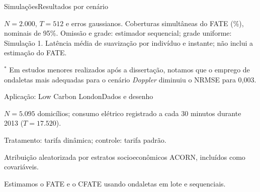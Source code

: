 \documentclass[aspectratio=169,t]{beamer}
\begin{document}
\begin{frame}{Simulações}{Resultados por cenário}
{\tamLegenda\renewcommand{}\setlength{\tabcolsep}{4bp}
\par}
\vspace{12bp}
{\tamLegenda $N=2.000$, $T=512$ e erros gaussianos. Coberturas simultâneas do FATE (\%), nominais de 95\%. Omissão e grade: estimador sequencial; grade uniforme: Simulação 1. Latência média de suavização por indivíduo e instante; não inclui a estimação do FATE.\par\vspace{5bp}$^*$ Em estudos menores realizados após a dissertação, notamos que o emprego de ondaletas mais adequadas para o cenário \textit{Doppler} diminuiu o NRMSE para 0,003.\par}
\end{frame}
\begin{frame}{Aplicação: Low Carbon London}{Dados e desenho}
\begin{topicos}
\item $N=5.095$ domicílios; consumo elétrico registrado a cada 30 minutos durante 2013 ($T=17.520$).
\item Tratamento: tarifa dinâmica; controle: tarifa padrão.
\item Atribuição aleatorizada por estratos socioeconômicos ACORN, incluídos como covariáveis.
\item Estimamos o FATE e o CFATE usando ondaletas em lote e sequenciais.
\end{topicos}
\end{frame}
\end{document}
